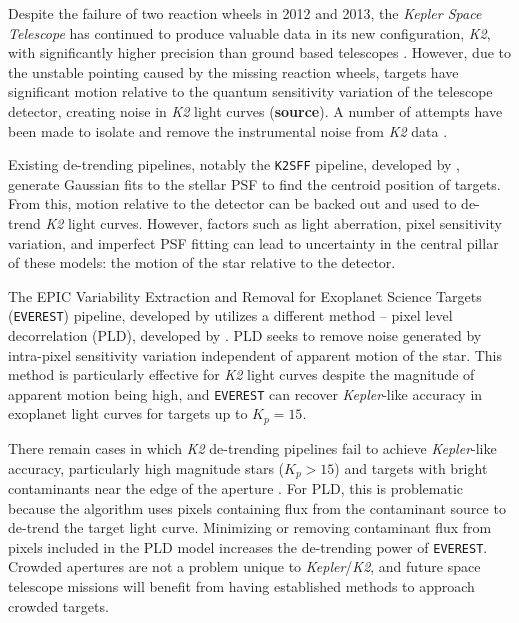 \documentclass[12pt,preprint]{aastex}
\begin{document}
Despite the failure of two reaction wheels in 2012 and 2013, the \textit{Kepler Space Telescope} has continued to produce valuable data in its new configuration, \textit{K2}, with significantly higher precision than ground based telescopes \citep{2014PASP..126..398H}. However, due to the unstable pointing caused by the missing reaction wheels, targets have significant motion relative to the quantum sensitivity variation of the telescope detector, creating noise in \textit{K2} light curves (\textbf{source}). A number of attempts have been made to isolate and remove the instrumental noise from \textit{K2} data \citep{2015A&A...579A..19A, 0004-637X-806-1-30, 2015MNRAS.454.4159H, 2015MNRAS.447.2880A, 2016MNRAS.459.2408A}.

Existing de-trending pipelines, notably the \texttt{K2SFF} pipeline, developed by \cite{2014PASP..126..948V}, generate Gaussian fits to the stellar PSF to find the centroid position of targets. From this, motion relative to the detector can be backed out and used to de-trend \textit{K2} light curves. However, factors such as light aberration, pixel sensitivity variation, and imperfect PSF fitting can lead to uncertainty in the central pillar of these models: the motion of the star relative to the detector.

The EPIC Variability Extraction and Removal for Exoplanet Science Targets (\texttt{EVEREST}) pipeline, developed by \cite{2016AJ....152..100L, 2017arXiv170205488L} utilizes a different method -- pixel level decorrelation (PLD), developed by \cite{0004-637X-805-2-132}. PLD seeks to remove noise generated by intra-pixel sensitivity variation independent of apparent motion of the star. This method is particularly effective for \textit{K2} light curves despite the magnitude of apparent motion being high, and \texttt{EVEREST} can recover \textit{Kepler}-like accuracy in exoplanet light curves for targets up to $K_p = 15$.

There remain cases in which \textit{K2} de-trending pipelines fail to achieve \textit{Kepler}-like accuracy, particularly high magnitude stars ($K_p > 15$) and targets with bright contaminants near the edge of the aperture \citep{2017arXiv170205488L}. For PLD, this is problematic because the algorithm uses pixels containing flux from the contaminant source to de-trend the target light curve. Minimizing or removing contaminant flux from pixels included in the PLD model increases the de-trending power of \texttt{EVEREST}. Crowded apertures are not a problem unique to \textit{Kepler}/\textit{K2}, and future space telescope missions will benefit from having established methods to approach crowded targets.
\end{document}

